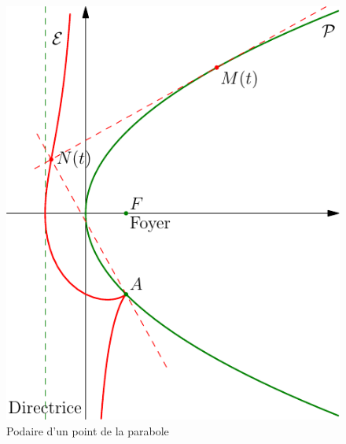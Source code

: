 \begin{figure}[h!t]
 \centering
 \includegraphics{./Cpapota_1.pdf}
 \caption{Podaire d'un point de la parabole}
 \label{fig:Cpapota_1}
\end{figure}

